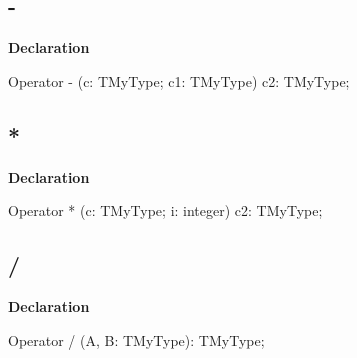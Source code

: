 \documentclass{report}
\begin{document}
\subsection*{-}
\begin{list}{}{
\setlength{\itemindent}{0cm}
\setlength{\listparindent}{0cm}
\setlength{\leftmargin}{\evensidemargin}
\addtolength{\leftmargin}{\tmplength}
\settowidth{\labelsep}{X}
\addtolength{\leftmargin}{\labelsep}
\setlength{\labelwidth}{\tmplength}
}
\begin{flushleft}
\item[\textbf{Declaration}\hfill]
\begin{ttfamily}
Operator - (c: TMyType; c1: TMyType) c2: TMyType;\end{ttfamily}


\end{flushleft}
\end{list}
\subsection*{*}
\begin{list}{}{
\setlength{\itemindent}{0cm}
\setlength{\listparindent}{0cm}
\setlength{\leftmargin}{\evensidemargin}
\addtolength{\leftmargin}{\tmplength}
\settowidth{\labelsep}{X}
\addtolength{\leftmargin}{\labelsep}
\setlength{\labelwidth}{\tmplength}
}
\begin{flushleft}
\item[\textbf{Declaration}\hfill]
\begin{ttfamily}
Operator * (c: TMyType; i: integer) c2: TMyType;\end{ttfamily}


\end{flushleft}
\end{list}
\subsection*{/}
\begin{list}{}{
\setlength{\itemindent}{0cm}
\setlength{\listparindent}{0cm}
\setlength{\leftmargin}{\evensidemargin}
\addtolength{\leftmargin}{\tmplength}
\settowidth{\labelsep}{X}
\addtolength{\leftmargin}{\labelsep}
\setlength{\labelwidth}{\tmplength}
}
\begin{flushleft}
\item[\textbf{Declaration}\hfill]
\begin{ttfamily}
Operator / (A, B: TMyType): TMyType;\end{ttfamily}


\end{flushleft}
\end{list}
\end{document}
